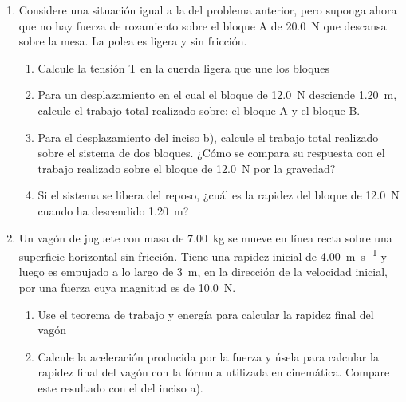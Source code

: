 \documentclass[Física - Práctica.root.tex]{subfiles}
\begin{document}
\begin{enumerate}
  \item Considere una situación igual a la del problema anterior, pero suponga ahora que no hay
        fuerza de rozamiento sobre el bloque A de \SI{20,0}{\newton} que descansa sobre la mesa. La polea
        es ligera y sin fricción.
        \begin{enumerate}
          \item Calcule la tensión T en la cuerda ligera que une los bloques
          \item Para un desplazamiento en el cual el bloque de \SI{12,0}{\newton} desciende \SI{1,20}{\meter},
                calcule el trabajo total realizado sobre: el bloque A y el bloque B.
          \item Para el desplazamiento del inciso b), calcule el trabajo total realizado sobre el sistema
                de dos bloques. ¿Cómo se compara su respuesta con el trabajo realizado sobre el bloque
                de \SI{12,0}{\newton} por la gravedad?
          \item Si el sistema se libera del reposo, ¿cuál es la rapidez del bloque de \SI{12,0}{\newton} cuando ha
                descendido \SI{1,20}{\meter}?

        \end{enumerate}

  \item Un vagón de juguete con masa de \SI{7,00}{\kilo\gram} se mueve en línea recta sobre una superficie
        horizontal sin fricción. Tiene una rapidez inicial de \SI[per-mode=fraction]{4,00}{\meter\per\second} y luego es empujado a lo
        largo de \SI{3}{\meter}, en la dirección de la velocidad inicial, por una fuerza cuya magnitud es de
        \SI{10,0}{\newton}.
        \begin{enumerate}
          \item Use el teorema de trabajo y energía para calcular la rapidez final del vagón
          \item Calcule la aceleración producida por la fuerza y úsela para calcular la rapidez final
                del vagón con la fórmula utilizada en cinemática. Compare este resultado con el del
                inciso a).
        \end{enumerate}


\end{enumerate}
\end{document}

